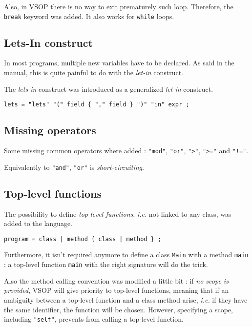 \documentclass[a4paper, 12pt]{article}
\begin{document}
	Also, in VSOP there is no way to exit prematurely such loop. Therefore, the \lstinline[style=vsop]{break} keyword was added. It also works for \lstinline[style=vsop]{while} loops.
	
	\subsection{Lets-In construct}
	
	In most programs, multiple new variables have to be declared. As said in the manual, this is quite painful to do with the \emph{let-in} construct.
	
	The \emph{lets-in} construct was introduced as a generalized \emph{let-in} construct.
	\begin{lstlisting}[style=vsop]
    lets = "lets" "(" field { "," field } ")" "in" expr ;
	\end{lstlisting}
	
	\subsection{Missing operators}
	
	Some missing common operators where added : \lstinline[style=vsop]{"mod"}, \lstinline[style=vsop]{"or"}, \lstinline[style=vsop]{">"}, \lstinline[style=vsop]{">="} and \lstinline[style=vsop]{"!="}.
	
	\begin{note}
	Equivalently to \lstinline[style=vsop]{"and"}, \lstinline[style=vsop]{"or"} is \emph{short-circuiting}.
	\end{note}
	
	\subsection{Top-level functions}
	
	The possibility to define \emph{top-level functions}, \emph{i.e.} not linked to any class, was added to the language.
	\begin{lstlisting}[style=vsop]
    program = class | method { class | method } ;
	\end{lstlisting}
	
	Furthermore, it isn't required anymore to define a class \texttt{Main} with a method \texttt{main} : a top-level function \texttt{main} with the right signature will do the trick.
	
	Also the method calling convention was modified a little bit : if \emph{no scope is provided}, VSOP will give priority to top-level functions, meaning that if an ambiguity between a top-level function and a class method arise, \emph{i.e.} if they have the same identifier, the function will be chosen. However, specifying a scope, including \lstinline[style=vsop]{"self"}, prevents from calling a top-level function.
	
\end{document}
